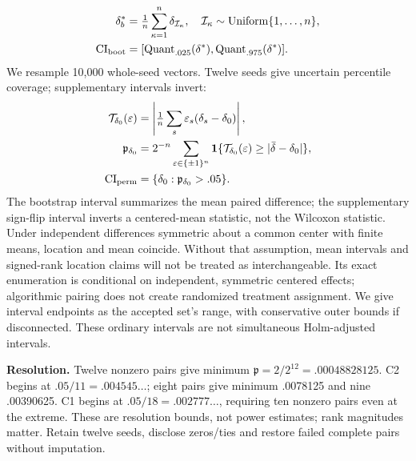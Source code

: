 \documentclass[10pt,a4paper]{article}
\begin{document}
\begin{equation}
\begin{aligned}
\delta_b^*&=\tfrac1n\sum_{\kappa=1}^n\delta_{\mathcal I_\kappa},\quad\mathcal I_\kappa\sim\operatorname{Uniform}\{1,\ldots,n\},\\
\mathrm{CI}_{\rm boot}&=[\operatorname{Quant}_{.025}(\delta^*),\operatorname{Quant}_{.975}(\delta^*)].
\end{aligned}
\label{eq:bootstrap}
\end{equation}
We resample 10,000 whole-seed vectors. Twelve seeds give uncertain percentile coverage; supplementary intervals invert:
\begin{equation}
\begin{aligned}
\mathcal T_{\delta_0}(\varepsilon)&=\left|\tfrac1n\sum_s\varepsilon_s(\delta_s-\delta_0)\right|,\\
\mathfrak p_{\delta_0}&=2^{-n}\sum_{\varepsilon\in\{\pm1\}^n}
\mathbf1\{\mathcal T_{\delta_0}(\varepsilon)\ge|\bar\delta-\delta_0|\},\\
\mathrm{CI}_{\rm perm}&=\{\delta_0:\mathfrak p_{\delta_0}>.05\}.
\end{aligned}
\label{eq:permutation}
\end{equation}
The bootstrap interval summarizes the mean paired difference; the supplementary sign-flip interval inverts a centered-mean statistic, not the Wilcoxon statistic. Under independent differences symmetric about a common center with finite means, location and mean coincide. Without that assumption, mean intervals and signed-rank location claims will not be treated as interchangeable. Its exact enumeration is conditional on independent, symmetric centered effects; algorithmic pairing does not create randomized treatment assignment. We give interval endpoints as the accepted set's range, with conservative outer bounds if disconnected. These ordinary intervals are not simultaneous Holm-adjusted intervals.

\textbf{Resolution.} Twelve nonzero pairs give minimum $\mathfrak p=2/2^{12}=.00048828125$. C2 begins at $.05/11=.004545\ldots$; eight pairs give minimum .0078125 and nine .00390625. C1 begins at $.05/18=.002777\ldots$, requiring ten nonzero pairs even at the extreme. These are resolution bounds, not power estimates; rank magnitudes matter. Retain twelve seeds, disclose zeros/ties and restore failed complete pairs without imputation.
\end{document}
